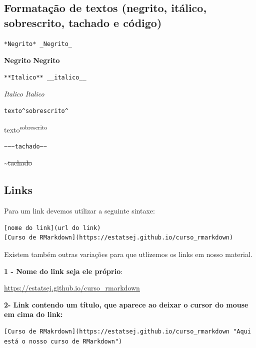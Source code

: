 \documentclass[
]{book}
\begin{document}
\hypertarget{formatauxe7uxe3o-de-textos-negrito-ituxe1lico-sobrescrito-tachado-e-cuxf3digo}{%
\subsection{Formatação de textos (negrito, itálico, sobrescrito, tachado e código)}\label{formatauxe7uxe3o-de-textos-negrito-ituxe1lico-sobrescrito-tachado-e-cuxf3digo}}

\begin{verbatim}
*Negrito* _Negrito_
\end{verbatim}

\textbf{Negrito} \textbf{Negrito}

\begin{verbatim}
**Italico** __italico__
\end{verbatim}

\emph{Italico} \emph{Italico}

\begin{verbatim}
texto^sobrescrito^
\end{verbatim}

texto\textsuperscript{sobrescrito}

\begin{verbatim}
~~~tachado~~
\end{verbatim}

\textasciitilde{}\sout{tachado}

\hypertarget{links}{%
\subsection{Links}\label{links}}

Para um link devemos utilizar a seguinte sintaxe:

\begin{verbatim}
[nome do link](url do link)
[Curso de RMarkdown](https://estatsej.github.io/curso_rmarkdown)
\end{verbatim}

Existem também outras variações para que utlizemos os links em nosso material.

\textbf{1 - Nome do link seja ele próprio}:

\url{https://estatsej.github.io/curso_rmarkdown}

\textbf{2- Link contendo um título, que aparece ao deixar o cursor do mouse em cima do link:}

\begin{verbatim}
[Curso de RMakrdown](https://estatsej.github.io/curso_rmarkdown "Aqui está o nosso curso de RMarkdown")
\end{verbatim}
\end{document}
